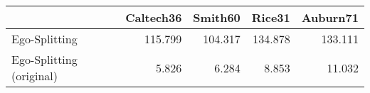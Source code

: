 \begin{tabular}{lrrrr}
\toprule
{} & Caltech36 & Smith60 &  Rice31 & Auburn71 \\
\midrule
Ego-Splitting            &   115.799 & 104.317 & 134.878 &  133.111 \\
Ego-Splitting (original) &     5.826 &   6.284 &   8.853 &   11.032 \\
\bottomrule
\end{tabular}
